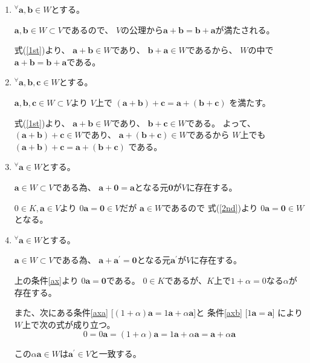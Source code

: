 \documentclass[12pt,b5paper]{ltjsarticle}
\begin{document}
\begin{enumerate}
 \item
      ${}^{\forall}\bm{a},\bm{b}\in W$とする。

      $\bm{a},\bm{b}\in W \subset V$であるので、
      $V$の公理から$\bm{a}+\bm{b}=\bm{b}+\bm{a}$が満たされる。

      式(\ref{1st})より、
      $\bm{a}+\bm{b}\in W$であり、
      $\bm{b}+\bm{a}\in W$であるから、
      $W$の中で$\bm{a}+\bm{b}=\bm{b}+\bm{a}$である。

 \item
      ${}^{\forall}\bm{a},\bm{b},\bm{c}\in W$とする。

      $\bm{a},\bm{b},\bm{c}\in W \subset V$より
      $V$上で
      $(\bm{a}+\bm{b})+\bm{c}=\bm{a}+(\bm{b}+\bm{c})$
      を満たす。

      式(\ref{1st})より、
      $\bm{a}+\bm{b}\in W$であり、
      $\bm{b}+\bm{c}\in W$である。
      よって、
      $(\bm{a}+\bm{b})+\bm{c}\in W$であり、
      $\bm{a}+(\bm{b}+\bm{c})\in W$であるから
      $W$上でも
      $(\bm{a}+\bm{b})+\bm{c}=\bm{a}+(\bm{b}+\bm{c})$
      である。

 \item \label{ax}
      ${}^{\forall}\bm{a}\in W$とする。

      $\bm{a}\in W \subset V$である為、
      $\bm{a}+\bm{0}=\bm{a}$となる元$\bm{0}$が$V$に存在する。

      $0\in K , \bm{a}\in V$より
      $0\bm{a}=\bm{0}\in V$だが
      $\bm{a}\in W$であるので
      式(\ref{2nd})より
      $0\bm{a}=\bm{0}\in W$となる。

 \item
      ${}^{\forall}\bm{a}\in W$とする。

      $\bm{a}\in W \subset V$である為、
      $\bm{a}+\bm{a^\prime}=\bm{0}$となる元$\bm{a^\prime}$が$V$に存在する。

      上の条件\ref{ax}より
      $0\bm{a}=\bm{0}$である。
      $0\in K$であるが、$K$上で$1+\alpha =0$なる$\alpha$が存在する。

      また、次にある条件\ref{axa}
      [$(1+\alpha)\bm{a}=1\bm{a}+\alpha\bm{a}$]と
      条件\ref{axb} [$1\bm{a}=\bm{a}$] により
      $W$上で次の式が成り立つ。
      \begin{equation}
       0 = 0\bm{a}=(1+\alpha)\bm{a}
        =1\bm{a}+\alpha\bm{a}
        =\bm{a}+\alpha\bm{a}
      \end{equation}

      この$\alpha\bm{a}\in W$は$\bm{a^\prime} \in V$と一致する。


\end{enumerate}
\end{document}
